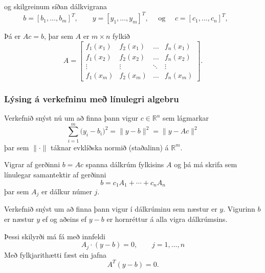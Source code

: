 \documentclass[icelandic,a4paper,12pt]{article}
\newcommand{\R}{{\mathbb  R}}
\begin{document}
\pause
og skilgreinum síðan dálkvigrana
\begin{equation*}
	b = [b_1,\dots,b_m]^T,\qquad 
	y = [y_1,\dots,y_m]^T,\quad \text{ og } \quad 
	c = [c_1,\dots,c_n]^T,\qquad 
\end{equation*}

\pause
Þá er $Ac=b$, þar sem $A$ er $m\times n$ fylkið
\begin{equation*}
	A = \left[\begin{matrix} 
		f_1(x_1)& f_2(x_1) & \dots & f_n(x_1) \\ 
		f_1(x_2)& f_2(x_2) & \dots & f_n(x_2) \\
		\vdots &\vdots &\ddots &\vdots \\
		f_1(x_m)& f_2(x_m) & \dots & f_n(x_m)
	\end{matrix}\right].
\end{equation*}


\subsubsection{Lýsing á verkefninu með línulegri algebru} 
Verkefnið snýst nú um að finna þann vigur $c\in \R^n$ sem lágmarkar
\begin{equation*}
	\sum_{i=1}^m \big(y_i-b_i\big)^2
	= \| y - b \|^2 = \| y - Ac \|^2
\end{equation*}
þar sem $\|\cdot\|$ táknar evklíðska normið (staðalinn) á $\R^m$.

\pause
\smallskip
Vigrar af gerðinni $b= Ac$ spanna dálkrúm fylkisins 
$A$ og þá má skrifa sem línulegar samantektir af gerðinni
\begin{equation*}
	b = c_1A_1 + \cdots + c_nA_n
\end{equation*}
þar sem $A_j$ er dálkur númer $j$.


Verkefnið snýst um að finna þann vigur í dálkrúminu sem næstur er
$y$. Vigurinn $b$ er næstur $y$ ef og aðeins ef $y-b$ er hornréttur á
alla vigra dálkrúmsins. 


\pause
Þessi skilyrði má fá með innfeldi 
\begin{equation*}
	A_j \cdot (y-b) = 0, \qquad j = 1, \ldots , n
\end{equation*}
Með fylkjarithætti fæst ein jafna
\begin{equation*}
	A^T (y-b) = 0.
\end{equation*}
\end{document}
